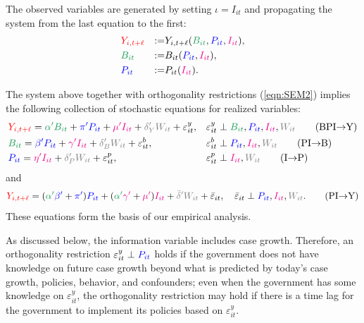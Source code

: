 \documentclass[11pt,reqno,letter]{amsart}
\theoremstyle{definition}
\renewcommand{\to}{{\rightarrow}}
\def\bcolor{\color{ForestGreen}}
\def\pcolor{\color{blue}}
\def\icolor{\color{magenta}}
\def\wcolor{\color{gray}}
\def\ycolor{\color{red}}
\begin{document}
 The observed variables are generated by setting $\iota = I_{it}$ and propagating
the system from the last equation to the first:
\[
  \begin{aligned}
& {\ycolor Y_{i,t+\ell}}  & := & Y_{i,t+\ell} ( {\bcolor B_{it} } ,{\pcolor P_{it}}, {\icolor I_{it}}), \\
& {\bcolor B_{it} } & := &   B_{it}({\pcolor P_{it} } ,{\icolor I_{it}}), \\
& {\pcolor P_{it} }& := &  P_{it}({\icolor I_{it}}). \end{aligned}
\]


The system above together with  orthogonality restrictions (\ref{eqn:SEM2}) implies the following collection of stochastic equations for realized variables:
\begin{align}
   &  {\ycolor  Y_{i,t+\ell}}
    = {\bcolor\alpha ' B_{it}} + {\pcolor\pi 'P_{it}} + {\icolor\mu'I_{it}} + {\wcolor\delta_Y 'W_{it}}  + \varepsilon^y_{it},
    &  & \varepsilon^y_{it} \perp {\bcolor B_{it}}, {\pcolor P_{it}}, {\icolor I_{it}}, {\wcolor W_{it}} \label{eq:R1} \tag{BPI$\to$Y} \\
    &  {\bcolor B_{it}}
     =  {\pcolor \beta' P_{it}} + {\icolor \gamma'I_{it}} +  {\wcolor \delta_B' W_{it}} + \varepsilon^b_{it},
   & & \varepsilon^b_{it} \perp {\pcolor P_{it}}, {\icolor I_{it}}, {\wcolor W_{it}}  \label{eq:R2} \tag{PI$\to$B}  \\
    & {\pcolor P_{it}}
    =  {\icolor\eta'I_{it}} + {\wcolor \delta_P' W_{it}} +   \varepsilon^p_{it},   & & \varepsilon^p_{it} \perp   {\icolor I_{it}}, {\wcolor W_{it}} \label{eq:R3}  \tag{I$\to$P}
       \end{align}
and
\begin{equation}
   {\ycolor  Y_{i,t+\ell}}
   = ( {\bcolor\alpha '}  {\pcolor \beta' }+{\pcolor\pi'} )
    {\pcolor P_{it}} + ( {\bcolor\alpha '}  {\icolor \gamma'} + {\icolor \mu'})
    {\icolor I_{it} }+ {\wcolor \bar{\delta} '}{\wcolor W_{it}}  + {\bar \varepsilon}_{it},  \quad   {\bar \varepsilon}_{it} \perp
  {\pcolor P_{it}},  {\icolor I_{it}}, {\wcolor W_{it}}.  \label{eq:R4} \tag{PI$\to$Y}
\end{equation}
These equations form the basis of our empirical analysis.

As discussed below, the information variable includes case growth. Therefore,  an orthogonality restriction  $ \varepsilon^y_{it} \perp   {\pcolor P_{it}}$ holds if  the government does not have knowledge on future case growth beyond what is predicted by today's case growth, policies,  behavior, and  confounders; even when the government has some knowledge on $\varepsilon^y_{it}$, the orthogonality restriction may hold if there is a time lag for the government to implement its policies based on $\varepsilon^y_{it}$.
\end{document}

